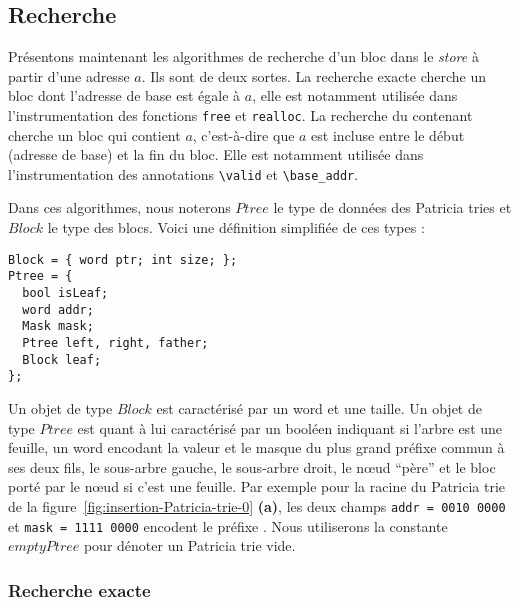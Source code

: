 \subsection{Recherche}


Présentons maintenant les algorithmes de recherche d'un bloc dans le
\textit{store} à partir d'une adresse $a$.
Ils sont de deux sortes.
La recherche exacte cherche un bloc dont l'adresse de base est égale à $a$, elle
est notamment utilisée dans l'instrumentation des fonctions \lstinline'free' et
\lstinline'realloc'.
La recherche du contenant cherche un bloc qui contient $a$, c'est-à-dire que
$a$ est incluse entre le début (adresse de base) et la fin du bloc.
Elle est notamment utilisée dans l'instrumentation des annotations
\lstinline'\valid' et \lstinline'\base_addr'.


Dans ces algorithmes, nous noterons $Ptree$ le type de données des Patricia
tries et $Block$ le type des blocs.
Voici une définition simplifiée de ces types :

\begin{lstlisting}
Block = { word ptr; int size; };
Ptree = {
  bool isLeaf;
  word addr;
  Mask mask;
  Ptree left, right, father;
  Block leaf;
};
\end{lstlisting}

Un objet de type $Block$ est caractérisé par un word et une taille.
Un objet de type $Ptree$ est quant à lui caractérisé par un booléen indiquant
si l'arbre est une feuille, un word encodant la valeur et le masque
du plus grand préfixe commun à ses deux fils, le sous-arbre gauche, le
sous-arbre droit, le n\oe{}ud ``père'' et le bloc porté par le n\oe{}ud si c'est
une feuille.
Par exemple pour la racine du Patricia trie  de la
figure~\ref{fig:insertion-Patricia-trie-0} \textbf{(a)}, les deux champs
\lstinline'addr = 0010 0000' et \lstinline'mask = 1111 0000' encodent le
préfixe .
Nous utiliserons la constante $emptyPtree$ pour dénoter un Patricia trie vide.



\subsubsection*{Recherche exacte}


